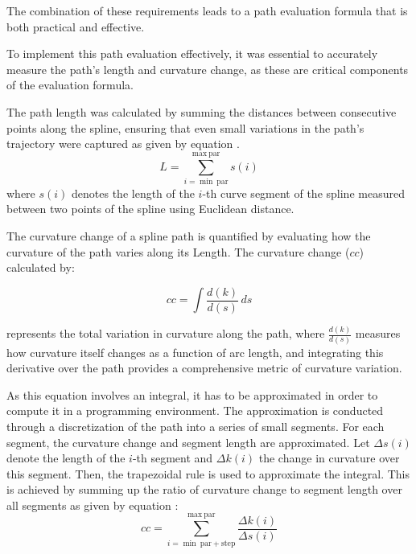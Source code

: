 The combination of these requirements leads to a path evaluation formula that is both practical and effective. 

To implement this path evaluation effectively, it was essential to accurately measure the path's length and curvature 
change, as these are critical components of the evaluation formula. 

The path length was calculated by summing the distances between consecutive points along the spline, ensuring that 
even small variations in the path's trajectory were captured as given by equation .
\begin{equation}
    L = \sum_{i=\min \ \text{par}}^{\max \ \text{par}} s(i)
    \label{length_formula}
\end{equation}
where \( s(i) \) denotes the length of the \(i\)-th curve segment of the spline measured between two points of the 
spline using Euclidean distance.

The curvature change of a spline path is quantified by evaluating how the curvature of the path varies along its Length.
The curvature change (\( cc \)) calculated by:

\begin{equation}
cc = \int \frac{d(k)}{d(s)} \, ds
\end{equation}

represents the total variation in curvature along the path, where \( \frac{d(k)}{d(s)} \) measures how curvature itself 
changes as a function of arc length, and integrating this derivative over the path provides a comprehensive metric of 
curvature variation.

As this equation involves an integral, it has to be approximated in order to compute it in a programming environment.
The approximation is conducted through a discretization of the path into a series of small segments. For each segment, 
the curvature change and segment length are approximated. Let \( \Delta s(i) \) denote the length of the \(i\)-th segment 
and \( \Delta k(i) \) the change in curvature over this segment.
Then, the trapezoidal rule is used to approximate the integral. 
This is achieved by summing up the ratio of curvature change to segment length over all segments as given by 
equation :
\begin{equation}
cc = \sum_{i = \min \ \text{par} + \text{step}}^{\max \ \text{par}} \frac{\Delta k(i)}{\Delta s(i)}
\label{curvature_change}
\end{equation}

